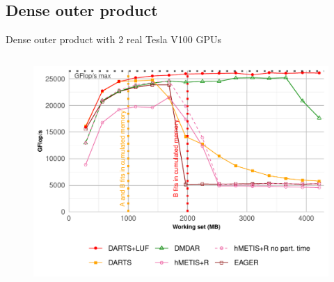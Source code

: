 \documentclass{libs/ufc_format}
\begin{document}
\subsection{Dense outer product}
\begin{frame}{Dense outer product with 2 real Tesla V100 GPUs}
    \begin{columns}{}
        \begin{column}{0.5\textwidth}
	\begin{figure}
		\center\includegraphics[scale = 0.3]{Images/GF_dynamic_data_aware_no_hfp_gemini-2-ipdps_2GPU.pdf}
	\end{figure}
	\end{column}


\end{columns}
\end{frame}
\end{document}
